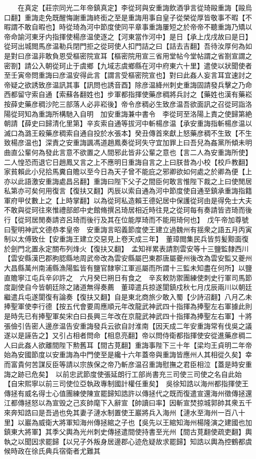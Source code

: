 　　在真定【莊宗同光二年帝鎮真定】李從珂與安重誨飲酒爭言從琦毆重誨【毆烏口翻】重誨走免既醒悔謝重誨終銜之至是重誨用事自皇子從榮從厚皆敬事不暇【不暇謂不敢自暇也】時從琦為河中節度使同平章事重誨屢短之於帝帝不聽重誨乃矯以帝命諭河東牙内指揮使楊彦温使逐之【河東當作河中】是日【承上戊戌故曰是日】從珂出城閲馬彦温勒兵閉門拒之從珂使人扣門詰之曰【詰去吉翻】吾待汝厚何為如是對曰彦温非敢負恩受樞密院宣耳【樞密院用宣三省用堂帖今堂帖謂之省劄宣謂之密劄】請公入朝從珂止于虞鄉【九域志虞鄉縣在河中府東六十里】遣使以狀聞使者至壬寅帝問重誨曰彦温安得此言【謂言受樞密院宣也】對曰此姦人妄言耳宜速討之帝疑之欲誘致彦温訊其事【訊問也誘音酉】除彦温絳州刺史重誨固請發兵擊之乃命西都留守索自通【索蘇各翻姓也】步軍都指揮使藥彦稠將兵討之【藥姓也漢有藥崧按薛史藥彦稠沙陀三部落人必非崧後】帝令彦稠必生致彦温吾欲面訊之召從珂詣洛陽從珂知為重誨所構馳入自明　加安重誨兼中書令　李從珂至洛陽上責之使歸第絶朝請【薛史曰歸清化里第】辛亥索自通等拔河中斬楊彦温【承安重誨指斬楊彦温以滅口為潞王殺藥彦稠索自通自投於水張本】癸丑傳首來獻上怒藥彦稠不生致【不生致楊彦温也】深責之安重誨諷馮道趙鳳奏從珂失守宜加罪上曰吾兒為姦黨所傾未明曲直公輩何為發此言意不欲置之人間邪此皆非公輩之意也【言二人為安重誨所使】二人惶恐而退它日趙鳳又言之上不應明日重誨自言之上曰朕昔為小校【校戶教翻】家貧賴此小兒拾馬糞自贍以至今日為天子曾不能庇之邪卿欲如何處之於卿為便【上亦以此語激安重誨處昌呂翻】重誨曰陛下父子之間臣何敢言惟陛下裁之上曰使閒居私第亦可矣何用復言【復扶又翻】丙辰以索自通為河中節度使自通至鎮承重誨指籍軍府甲仗數上之【上時掌翻】以為從珂私造賴王德妃居中保護從珂由是得免士大夫不敢與從珂往來惟禮部郎中史館脩撰呂琦居相近時往見之從珂每有奏請皆咨琦而後行【從珂居閒奏請咨呂琦而後行及其在位能厚琦而不能用琦何也】　戊午帝加尊號曰聖明神武文德恭孝皇帝　安重誨言昭義節度使王建立過魏州有揺衆之語五月丙寅制以太傅致仕【安重誨王建立交惡見上卷天成三年】　董璋閲集民兵皆剪髪黥面復於劍門北置永定關布列烽火【復扶又翻】　孟知祥累表請割雲安等十三鹽監隸西川【雲安縣漢巴郡胊䏰縣地周武帝改為雲安縣屬巴東郡唐屬夔州後改為雲安監又夔州大昌縣萬州南浦縣漁陽監皆有鹽官隸寧江軍巡屬而所謂十三監未知盡在何所】以鹽直贍寧江屯兵辛卯許之　六月癸巳朔日有食之　辛亥敕防禦團練使刺史行軍司馬節度副使自今皆朝廷除之諸道無得奏薦　董璋遣兵掠遂閬鎮戍秋七月戊辰兩川以朝廷繼遣兵屯遂閬復有論奏【復扶又翻】自是東北商旅少敢入蜀【少詩沼翻】八月乙未捧聖軍使李行德【按五代會要周應順元年改龍武神武四十指揮為捧聖左右軍據此則是時先已有捧聖軍矣宋白曰長興三年改在京龍武神武四十指揮為捧聖左右軍】十將張儉引告密人邊彦温告安重誨發兵云欲自討淮南【因天成二年安重誨常有伐吳之議遂以是誣告之】又引占相者問命【相息亮翻】帝以問侍衛都指揮使安從進藥彦稠二人曰此姦人欲離間陛下勲舊耳【間古莧翻】重誨事陛下三十年【梁均王貞明二年帝始為安國節度以安重誨為中門使至是纔十六年蓋帝與重誨皆應州人其相從久矣】幸而富貴何苦謀反臣等請以宗族保之帝乃斬彦温召重誨慰撫之君臣相泣【蓋是時安重誨之跡已危矣】　以前忠武節度使張延朗行工部尚書充三司使三司使之名自此始【自宋熙寧以前三司使位亞執政專制國計權任重矣】　吳徐知誥以海州都指揮使王傳拯有威名得士心值團練使陳宣罷歸知誥許以傳拯代之既而復遣宣還海州徵傳拯還江都傳拯怒以為宣毁之己亥帥麾下入辭宣【帥讀曰率】因斬宣焚掠城郭帥其衆五千來奔知誥曰是吾過也免其妻子漣水制置使王巖將兵入海州【漣水至海州一百八十里】以巖為威衛大將軍知海州傳拯綰之子也【吳先以王綰知海州楊隆演之建國也加鎮東大將軍】其季父輿為光州刺史傳拯遣間使持書至光州【間古莧翻使疏吏翻】輿執之以聞因求罷歸【以兄子外叛身居邊郡心迹危疑故求罷歸】知誥以輿為控鶴都虞候時政在徐氏典兵宿衛者尤難其